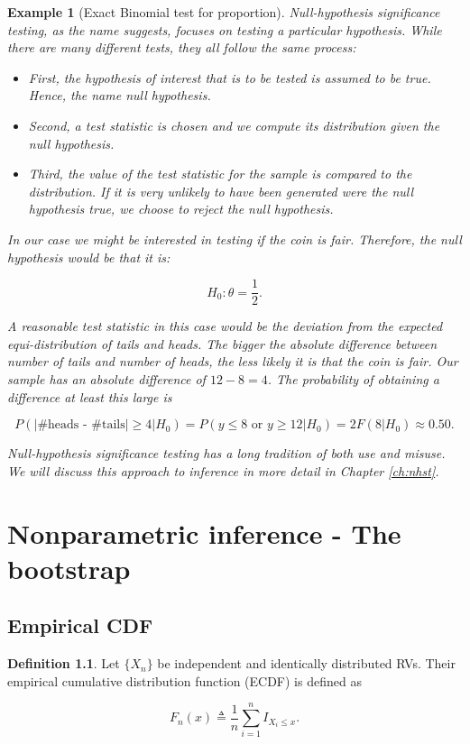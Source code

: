 \documentclass{book}
\theoremstyle{plain}%
\newtheorem{prototheorem}{Example}[section]
\newenvironment{cexample}
   {\colorlet{shadecolor}{gray!10}\begin{shaded}\begin{prototheorem}}
   {\end{prototheorem}\end{shaded}}
\theoremstyle{definition}
\newtheorem{definition}{Definition}[section]
\begin{document}
\begin{cexample}[Exact Binomial test for proportion] Null-hypothesis significance testing, as the name suggests, focuses on testing a particular hypothesis. While there are many different tests, they all follow the same process:

\begin{itemize}
\item First, the hypothesis of interest that is to be tested is assumed to be true. Hence, the name \emph{null hypothesis}.
\item Second, a test statistic is chosen and we compute its distribution given the null hypothesis.
\item Third, the value of the test statistic for the sample is compared to the distribution. If it is very unlikely to have been generated were the null hypothesis true, we choose to reject the null hypothesis.
\end{itemize}

In our case we might be interested in testing if the coin is fair. Therefore, the null hypothesis would be that it is:

$$H_0: \theta = \frac{1}{2}.$$

A reasonable test statistic in this case would be the deviation from the expected equi-distribution of tails and heads. The bigger the absolute difference between number of tails and number of heads, the less likely it is that the coin is fair. Our sample has an absolute difference of $12 - 8 = 4$. The probability of obtaining a difference at least this large is 

$$P(|\text{\#heads - \#tails}| \geq 4| H_0)  = P(y \leq 8 \text{ or } y \geq 12| H_0) = 2F(8|H_0) \approx 0.50.$$

Null-hypothesis significance testing has a long tradition of both use and misuse. We will discuss this approach to inference in more detail in Chapter \ref{ch:nhst}.
\end{cexample}



\chapter{Nonparametric inference - The bootstrap}

\section{Empirical CDF}

\begin{definition} Let $\{X_n\}$ be independent and identically distributed RVs. Their empirical cumulative distribution function (ECDF) is defined as

$$F_n(x) \triangleq \frac{1}{n}\sum_{i=1}^n I_{X_i \leq x}.$$
\end{definition}
\end{document}
